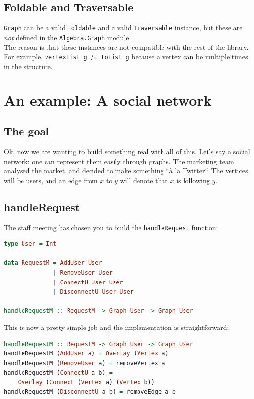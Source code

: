 \documentclass[10pt,a4paper]{article}
\begin{document}
\subsection{Foldable and Traversable}
\verb|Graph| can be a valid \verb|Foldable| and a valid \verb|Traversable| instance, but these are \emph{not} defined in the \verb|Algebra.Graph| module.\\
The reason is that these instances are not compatible with the rest of the library. For example, \verb|vertexList g /= toList g| because a vertex can be multiple times in the structure.

\section{An example: A social network}
\subsection{The goal}

Ok, now we are wanting to build something real with all of this. Let's say a social network: one can represent them easily through graphs.
The marketing team analysed the market, and decided to make something ``à la Twitter``. The vertices will be users, and an edge from $x$ to $y$ will denote that $x$ is following $y$.

\subsection{handleRequest}
The staff meeting has chosen you to build the \verb|handleRequest| function:
\begin{lstlisting}[language=Haskell, frame=single]
type User = Int

data RequestM = AddUser User
			  | RemoveUser User
			  | ConnectU User User
			  | DisconnectU User User

handleRequestM :: RequestM -> Graph User -> Graph User
\end{lstlisting}

This is now a pretty simple job and the implementation is straightforward:
\begin{lstlisting}[language=Haskell, frame=single]
handleRequestM :: RequestM -> Graph User -> Graph User
handleRequestM (AddUser a) = Overlay (Vertex a)
handleRequestM (RemoveUser a) = removeVertex a
handleRequestM (ConnectU a b) =
	Overlay (Connect (Vertex a) (Vertex b))
handleRequestM (DisconnectU a b) = removeEdge a b
\end{lstlisting}
\end{document}
